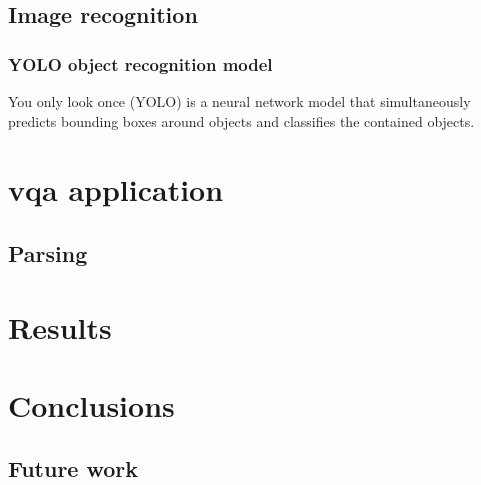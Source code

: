 \documentclass[11pt, a4paper]{article}
\begin{document}
\subsection{Image recognition}

\subsubsection{YOLO object recognition model}

You only look once (YOLO) \citep{RedmonYouOnlyLook2015} is a neural network model that simultaneously predicts bounding boxes around objects and classifies the contained objects.

\section{\Gls{vqa} application}

\subsection{Parsing}

\section{Results}

\section{Conclusions}

\subsection{Future work}


\end{document}
